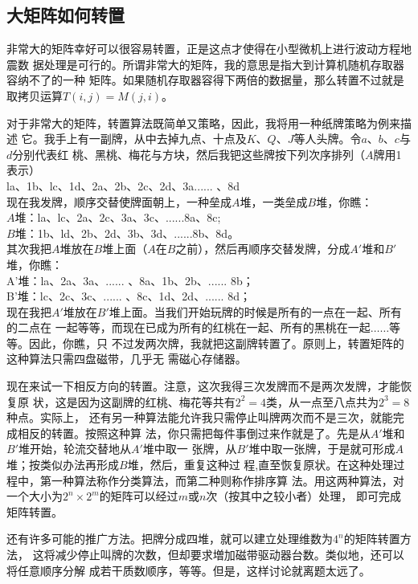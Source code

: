 \subsection{大矩阵如何转置}
非常大的矩阵幸好可以很容易转置，正是这点才使得在小型微机上进行波动方程地震数
据处理是可行的。所谓非常大的矩阵，我的意思是指大到计算机随机存取器容纳不了的一种
矩阵。如果随机存取器容得下两倍的数据量，那么转置不过就是取拷贝运算$T(i,j)=M(j,i)$。

对于非常大的矩阵，转置算法既简单又策略，因此，我将用一种纸牌策略为例来描述
它。我手上有一副牌，从中去掉九点、十点及$K$、$Q$、$J$等人头牌。令$a$、$b$、$c$与$d$分别代表红
桃、黑桃、梅花与方块，然后我钯这些牌按下列次序排列（$A$牌用1表示）\\
la、1b、lc、1d、2a、2b、2c、2d、3a...... 、8d\\
现在我发牌，顺序交替使牌面朝上，一种垒成$A$堆，一类垒成$B$堆，你瞧：\\
$A$堆：la、lc、2a、2c、3a、3c、......8a、8c;\\
$B$堆：1b、ld、2b、2d、3b、3d、......8b、8d。\\
其次我把$A$堆放在$B$堆上面（$A$在$B$之前），然后再顺序交替发牌，分成$A'$堆和$B'$堆，你瞧：\\
A'堆：la、2a、3a、...... 、8a、1b、2b、...... 8b；\\
B'堆：lc、2c、3c、...... 、8c、1d、2d、...... 8d；\\
现在我把$A'$堆放在$B'$堆上面。当我们开始玩牌的时候是所有的一点在一起、所有的二点在
一起等等，而现在已成为所有的红桃在一起、所有的黑桃在一起$\ldots\ldots$等等。因此，你瞧，只
不过发两次牌，我就把这副牌转置了。原则上，转置矩阵的这种算法只需四盘磁带，几乎无
需磁心存储器。

现在来试一下相反方向的转置。注意，这次我得三次发牌而不是两次发牌，才能恢复原
状，这是因为这副牌的红桃、梅花等共有$2^2=4$类，从一点至八点共为$2^3=8$种点。实际上，
还有另一种算法能允许我只需停止叫牌两次而不是三次，就能完成相反的转置。按照这种算
法，你只需把每件事倒过来作就是了。先是从$A'$堆和$B'$堆开始，轮流交替地从$A'$堆中取一
张牌，从$B'$堆中取一张牌，于是就可形成$A$堆；按类似办法再形成$B$堆，然后，重复这种过
程,直至恢复原状。在这种处理过程中，第一种算法称作分类算法，而第二种则称作排序算
法。用这两种算法，对一个大小为$2^n\times 2^m$的矩阵可以经过$m$或$n$次（按其中之较小者）处理，
即可完成矩阵转置。

还有许多可能的推广方法。把牌分成四堆，就可以建立处理维数为$4^n$的矩阵转置方法，
这将减少停止叫牌的次数，但却要求増加磁带驱动器台数。类似地，还可以将任意顺序分解
成若干质数顺序，等等。但是，这样讨论就离题太远了。

